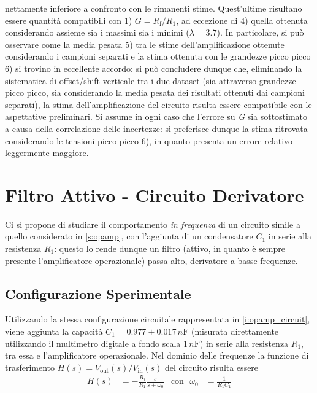 \documentclass[a4paper,11pt]{article} %
\begin{document}
\noindent nettamente inferiore a confronto con le rimanenti stime. Quest'ultime risultano essere quantità compatibili
con 1) $G=R_{\text{f}}/R_{1}$, ad eccezione di 4) quella ottenuta considerando assieme sia i massimi sia i minimi
($\lambda = 3.7$). In particolare, si può osservare come la media pesata 5) tra le stime dell'amplificazione ottenute
considerando i campioni separati e la stima ottenuta con le grandezze picco picco 6) si trovino in eccellente accordo:
si può concludere dunque che, eliminando la sistematica di offset/shift verticale tra i due dataset (sia attraverso
grandezze picco picco, sia considerando la media pesata dei risultati ottenuti dai campioni separati), la stima
dell'amplificazione del circuito risulta essere compatibile con le aspettative preliminari. Si assume in ogni caso che
l'errore su \textit{G} sia sottostimato a causa della correlazione delle incertezze: si preferisce dunque la stima
ritrovata considerando le tensioni picco picco 6), in quanto presenta un errore relativo leggermente maggiore.



\section{Filtro Attivo - Circuito Derivatore}
Ci si propone di studiare il comportamento \textit{in frequenza} di un circuito simile a quello
considerato in \autoref{s:opamp}, con l'aggiunta di un condensatore $C_{1}$ in serie alla resistenza $R_{1}$: questo lo
rende dunque un filtro (attivo, in quanto è sempre presente l'amplificatore operazionale) passa alto, derivatore a basse
frequenze. 


\subsection{Configurazione Sperimentale}
Utilizzando la stessa configurazione circuitale rappresentata in \autoref{i:opamp_circuit}, viene aggiunta la capacità
$C_{1} = 0.977 \pm 0.017 \,\si{n\farad}$ (misurata direttamente utilizzando il multimetro digitale a fondo scala
$1\,\si{n\farad}$) in serie alla resistenza $R_{1}$, tra essa e l'amplificatore operazionale. Nel dominio delle
frequenze la funzione di trasferimento $H(s)=V_{\text{out}}(s)/V_{\text{in}}(s)$ del circuito risulta essere 
\begin{align}
	H(s) &= -\frac{R_{\text{f}}}{R_{1}}\frac{s}{s+\omega_{0}} & \text{con}\,\,\,\, \omega_{0}&=\frac{1}{R_{1}C_{1}}
\end{align}
\end{document}
